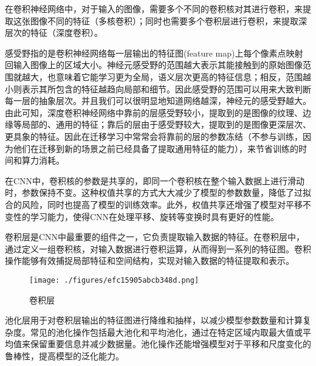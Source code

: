 


在卷积神经网络中，对于输入的图像，需要多个不同的卷积核对其进行卷积，来提取这张图像不同的特征（多核卷积）；同时也需要多个卷积层进行卷积，来提取深层次的特征（深度卷积）。

感受野指的是卷积神经网络每一层输出的特征图(feature map)上每个像素点映射回输入图像上的区域大小。神经元感受野的范围越大表示其能接触到的原始图像范围就越大，也意味着它能学习更为全局，语义层次更高的特征信息；相反，范围越小则表示其所包含的特征越趋向局部和细节。因此感受野的范围可以用来大致判断每一层的抽象层次。并且我们可以很明显地知道网络越深，神经元的感受野越大。由此可知，深度卷积神经网络中靠前的层感受野较小，提取到的是图像的纹理、边缘等局部的、通用的特征；靠后的层由于感受野较大，提取到的是图像更深层次、更具象的特征。因此在迁移学习中常常会将靠前的层的参数冻结（不参与训练，因为他们在迁移到新的场景之前已经具备了提取通用特征的能力），来节省训练的时间和算力消耗。

在CNN中，卷积核的参数是共享的，即同一个卷积核在整个输入数据上进行滑动时，参数保持不变。这种权值共享的方式大大减少了模型的参数数量，降低了过拟合的风险，同时也提高了模型的训练效率。此外，权值共享还增强了模型对平移不变性的学习能力，使得CNN在处理平移、旋转等变换时具有更好的性能。

卷积层是CNN中最重要的组件之一，它负责提取输入数据的特征。在卷积层中，通过定义一组卷积核，对输入数据进行卷积运算，从而得到一系列的特征图。卷积操作能够有效捕捉局部特征和空间结构，实现对输入数据的特征提取和表示。\begin{figure}[ht]
\centering
\texttt{[image: ./figures/efc15905abcb348d.png]}
\caption{卷积层} \label{fig_CNN3_1}
\end{figure}

池化层用于对卷积层输出的特征图进行降维和抽样，以减少模型参数数量和计算复杂度。常见的池化操作包括最大池化和平均池化，通过在特定区域内取最大值或平均值来保留重要信息并减少数据量。池化操作还能增强模型对于平移和尺度变化的鲁棒性，提高模型的泛化能力。